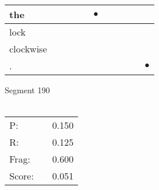 \documentclass[landscape]{article}
\newcommand{\ssp}{\hspace{2pt}}
\newcommand{\mex}{\cellcolor{g}$\bullet$}
\begin{document}
\begin{tabular}{|l|p{10pt}|p{10pt}|p{10pt}|p{10pt}|p{10pt}|p{10pt}|p{10pt}|p{10pt}|p{10pt}|p{10pt}|}
\hline
\ssp \cellcolor{ref4}the \ssp&\hspace{2pt}&\hspace{2pt}&\hspace{2pt}&\hspace{2pt}&\hspace{2pt}\mex&\hspace{2pt}&\hspace{2pt}&\hspace{2pt}&\hspace{2pt}&\hspace{2pt}\\
\hline
\ssp lock \ssp&\hspace{2pt}&\hspace{2pt}&\hspace{2pt}&\hspace{2pt}&\hspace{2pt}&\hspace{2pt}&\hspace{2pt}&\hspace{2pt}&\hspace{2pt}&\hspace{2pt}\\
\hline
\ssp clockwise \ssp&\hspace{2pt}&\hspace{2pt}&\hspace{2pt}&\hspace{2pt}&\hspace{2pt}&\hspace{2pt}&\hspace{2pt}&\hspace{2pt}&\hspace{2pt}&\hspace{2pt}\\
\hline
\ssp \cellcolor{ref9}. \ssp&\hspace{2pt}&\hspace{2pt}&\hspace{2pt}&\hspace{2pt}&\hspace{2pt}&\hspace{2pt}&\hspace{2pt}&\hspace{2pt}&\hspace{2pt}&\hspace{2pt}\mex\\
\hline
\end{tabular}

\vspace{6pt}
\noindent Segment 190\\\\
\noindent\begin{tabular}{lm{12pt}r}
\hline
P:&&0.150\\
R:&&0.125\\
Frag:&&0.600\\
Score:&&0.051\\
\end{tabular}
\end{document}
